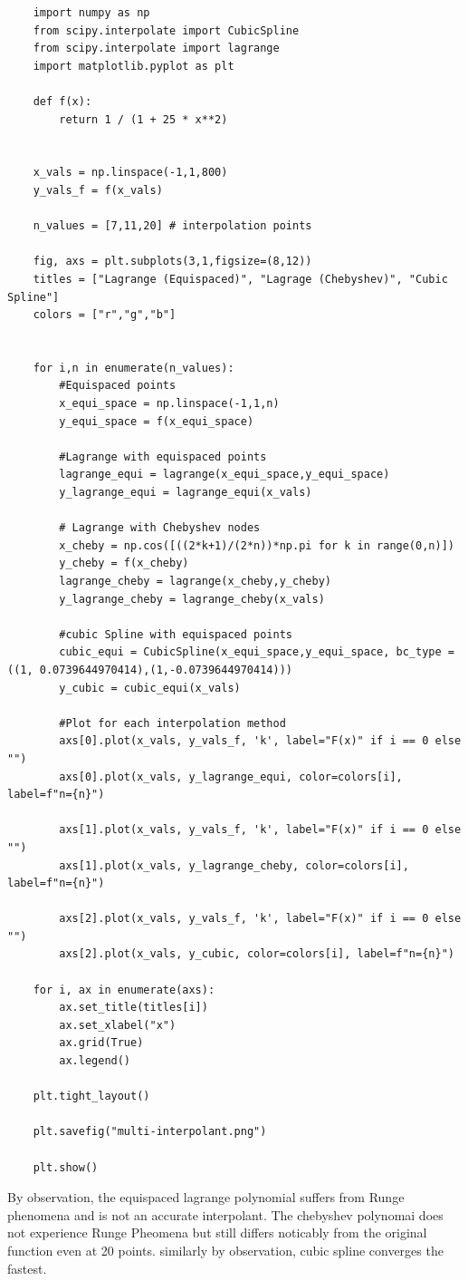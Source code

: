 \documentclass{amsart}
\begin{document}
    \begin{lstlisting}
    import numpy as np
    from scipy.interpolate import CubicSpline
    from scipy.interpolate import lagrange
    import matplotlib.pyplot as plt

    def f(x):
        return 1 / (1 + 25 * x**2)


    x_vals = np.linspace(-1,1,800)
    y_vals_f = f(x_vals)

    n_values = [7,11,20] # interpolation points

    fig, axs = plt.subplots(3,1,figsize=(8,12))
    titles = ["Lagrange (Equispaced)", "Lagrage (Chebyshev)", "Cubic Spline"]
    colors = ["r","g","b"]


    for i,n in enumerate(n_values):
        #Equispaced points
        x_equi_space = np.linspace(-1,1,n)
        y_equi_space = f(x_equi_space)

        #Lagrange with equispaced points
        lagrange_equi = lagrange(x_equi_space,y_equi_space)
        y_lagrange_equi = lagrange_equi(x_vals)

        # Lagrange with Chebyshev nodes
        x_cheby = np.cos([((2*k+1)/(2*n))*np.pi for k in range(0,n)])
        y_cheby = f(x_cheby)
        lagrange_cheby = lagrange(x_cheby,y_cheby)
        y_lagrange_cheby = lagrange_cheby(x_vals)

        #cubic Spline with equispaced points
        cubic_equi = CubicSpline(x_equi_space,y_equi_space, bc_type = ((1, 0.0739644970414),(1,-0.0739644970414)))
        y_cubic = cubic_equi(x_vals)

        #Plot for each interpolation method
        axs[0].plot(x_vals, y_vals_f, 'k', label="F(x)" if i == 0 else "")
        axs[0].plot(x_vals, y_lagrange_equi, color=colors[i], label=f"n={n}")

        axs[1].plot(x_vals, y_vals_f, 'k', label="F(x)" if i == 0 else "")
        axs[1].plot(x_vals, y_lagrange_cheby, color=colors[i], label=f"n={n}")

        axs[2].plot(x_vals, y_vals_f, 'k', label="F(x)" if i == 0 else "")
        axs[2].plot(x_vals, y_cubic, color=colors[i], label=f"n={n}")

    for i, ax in enumerate(axs):
        ax.set_title(titles[i])
        ax.set_xlabel("x")
        ax.grid(True)
        ax.legend()

    plt.tight_layout()

    plt.savefig("multi-interpolant.png")

    plt.show()
    \end{lstlisting}
    By observation, the equispaced lagrange polynomial suffers from Runge phenomena and is not an accurate interpolant.
    The chebyshev polynomai does not experience Runge Pheomena but still differs noticably from the original function even at 20 points.
    similarly by observation, cubic spline converges the fastest.
\end{document}
